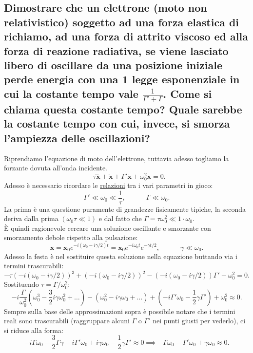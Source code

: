 \subsection[\hspace{2mm} Legge di smorzamento di energia ed ampiezza per elettrone legato elasticamente]{Dimostrare che un elettrone (moto non relativistico) soggetto ad una forza elastica di richiamo, ad una forza di attrito viscoso ed alla forza di reazione radiativa, se viene lasciato libero di oscillare da una posizione iniziale perde energia con una 1 legge esponenziale in cui la costante tempo vale $\frac{1}{\Gamma' + \Gamma}$. Come si chiama questa costante tempo? Quale sarebbe la costante tempo con cui, invece, si smorza l'ampiezza delle oscillazioni?}
Riprendiamo l'equazione di moto dell'elettrone, tuttavia adesso togliamo la forzante dovuta all'onda incidente.
\[
	- \tau \dddot{\boldsymbol{x}} + \ddot{\boldsymbol{x}} + \Gamma' \dot{\boldsymbol{x}} + \omega_0^2 \boldsymbol{x} = 0 
.\]  
Adesso è necessario ricordare le \hyperref[eq:relazione-parametri-elettrone]{relazioni} tra i vari parametri in gioco:
\[
	\Gamma' \ll \omega_0 \ll \frac{1}{\tau}, \quad \quad \quad  
	\Gamma \ll \omega_0
.\] 
La prima è una questione puramente di grandezze fisicamente tipiche, la seconda deriva dalla prima $\left( \omega_0 \tau \ll 1 \right) $ e dal fatto che $\Gamma = \tau \omega_0^2 \ll 1 \cdot \omega_0$.\\
È quindi ragionevole cercare una soluzione oscillante e smorzante con smorzamento debole rispetto alla pulsazione:
\[
	\boldsymbol{x} = \boldsymbol{x}_0 e^{-i\left( \omega_0 - i \gamma/2 \right)t } = \boldsymbol{x}_0 e^{-i \omega_0t} e^{-\gamma t /2}, \quad \quad \quad 
	\gamma \ll \omega_0
.\]
Adesso la festa è nel sostituire questa soluzione nella equazione buttando via i termini trascurabili:
\[
	- \tau \left( -i\left( \omega_0 - i \gamma /2 \right)  \right)^3 + \left( -i\left( \omega_0 - i \gamma /2 \right) \right)^2 - \left( -i\left( \omega_0 - i \gamma /2 \right) \right) \Gamma' - \omega_0^2 = 0 
.\]
Sostituendo $\tau = \Gamma / \omega_0^2$:
\[
	-i \frac{\Gamma}{\omega_0^2}\left( \omega_0^3 - \frac{3}{2} i \gamma \omega_0^2 + \ldots \right) - \left( \omega_0^2 - i \gamma \omega_0 + \ldots \right) + 
	\left( -i \Gamma' \omega_0 - \frac{1}{2} \gamma \Gamma'  \right) + \omega_0^2 \approx 0 
.\] 
Sempre sulla base delle approssimazioni sopra è possibile notare che i termini reali sono trascurabili (raggruppare alcuni $\Gamma$ o $\Gamma'$ nei punti giusti per vederlo), ci si riduce alla forma:
\[
	-i \Gamma \omega_0 - \frac{3}{2} \Gamma \gamma - i \Gamma' \omega_0 + i \gamma \omega_0 - \frac{1}{2} \gamma \Gamma' \approx 0 \implies 
	- \Gamma \omega_0 - \Gamma' \omega_0 + \gamma \omega_0 \approx 0 
.\] 
